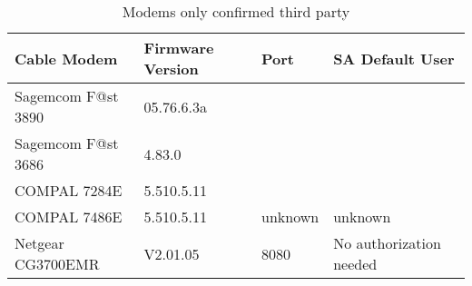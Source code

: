 \begin{table}[htp]
    \begin{tabular}{|l|l|l|l|}
    \hline
    \rowcolor[HTML]{9B9B9B} 
    \textbf{Cable Modem} & \textbf{Firmware Version}  & \textbf{Port}             & {\color[HTML]{333333} \textbf{SA Default User}}                                                      \\ \hline
    Sagemcom F@st 3890   & 05.76.6.3a                 &                           &                                                                                                      \\ \cline{1-2}
    Sagemcom F@st 3686   & 4.83.0                     &                           &                                                                                                      \\ \cline{1-2}
    COMPAL 7284E         & 5.510.5.11                 &                           &                                                                                                      \\ \cline{1-2}
    COMPAL 7486E         & 5.510.5.11                 & \multirow{-4}{*}{unknown} & \multirow{-4}{*}{unknown}                                                                            \\ \hline
    Netgear CG3700EMR    & V2.01.05                   & 8080                      & No authorization needed                                                                              \\ \hline
    \end{tabular}
    \caption{Modems only confirmed third party}
\end{table}